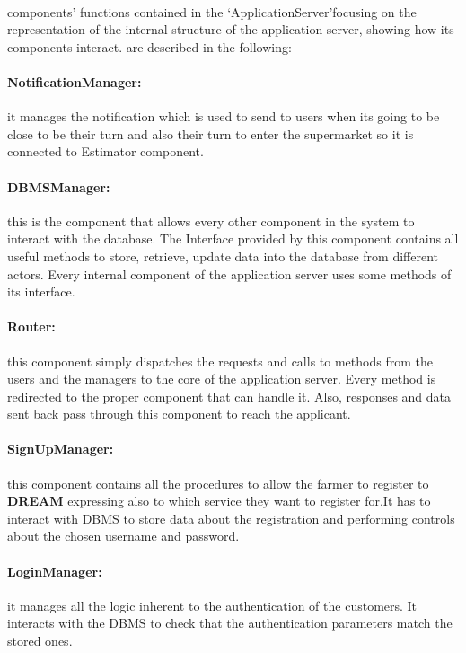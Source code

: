 \paragraph{} components’ functions contained in the ‘ApplicationServer’focusing on the representation of the internal structure of the application server, showing how its components interact. are described in the following:

\paragraph{NotificationManager:} it manages the notification which is used to send to users when its going to be close to be their turn and also their turn to enter the supermarket so it is connected to Estimator component.
\paragraph{DBMSManager:} this is the component that allows every other component in the system to interact with the database. The Interface provided by this component contains all useful methods to store, retrieve, update data into the database
from different actors. Every internal component of the application server uses some methods of its interface.
\paragraph{Router:} this component simply dispatches the requests and calls to methods from the users and the managers to the core of the application server. Every method is redirected to the proper component that can handle it. Also, responses and data sent back pass through this component to reach the applicant.
\paragraph{SignUpManager:} this component contains all the procedures to allow the farmer to register to \textbf{DREAM} expressing also to which service they want to register for.It has to interact with DBMS to store data about the registration and performing controls about the chosen username and password.
\paragraph{LoginManager:} it manages all the logic inherent to the authentication of the customers. It interacts with the DBMS to check that the authentication parameters match the stored ones.
